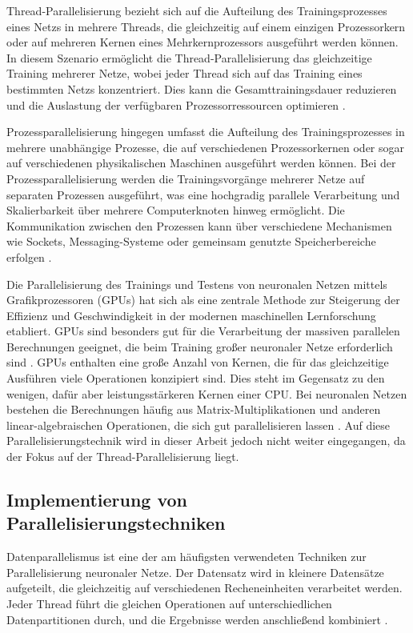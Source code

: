 Thread-Parallelisierung bezieht sich auf die Aufteilung des Trainingsprozesses eines Netzs in mehrere Threads, die gleichzeitig auf einem einzigen Prozessorkern oder auf mehreren Kernen eines Mehrkernprozessors ausgeführt werden können. In diesem Szenario ermöglicht die Thread-Parallelisierung das gleichzeitige Training mehrerer Netze, wobei jeder Thread sich auf das Training eines bestimmten Netzs konzentriert. Dies kann die Gesamttrainingsdauer reduzieren und die Auslastung der verfügbaren Prozessorressourcen optimieren \citep{Flynn_Computer_Organizations_and_their_Effectiveness}.

Prozessparallelisierung hingegen umfasst die Aufteilung des Trainingsprozesses in mehrere unabhängige Prozesse, die auf verschiedenen Prozessorkernen oder sogar auf verschiedenen physikalischen Maschinen ausgeführt werden können. Bei der Prozessparallelisierung werden die Trainingsvorgänge mehrerer Netze auf separaten Prozessen ausgeführt, was eine hochgradig parallele Verarbeitung und Skalierbarkeit über mehrere Computerknoten hinweg ermöglicht. Die Kommunikation zwischen den Prozessen kann über verschiedene Mechanismen wie Sockets, Messaging-Systeme oder gemeinsam genutzte Speicherbereiche erfolgen \citep{Flynn_Computer_Organizations_and_their_Effectiveness}.

Die Parallelisierung des Trainings und Testens von neuronalen Netzen mittels Grafikprozessoren (GPUs) hat sich als eine zentrale Methode zur Steigerung der Effizienz und Geschwindigkeit in der modernen maschinellen Lernforschung etabliert. GPUs sind besonders gut für die Verarbeitung der massiven parallelen Berechnungen geeignet, die beim Training großer neuronaler Netze erforderlich sind \citep{scalable_parallel_programming_with_cuda}. GPUs enthalten eine große Anzahl von Kernen, die für das gleichzeitige Ausführen viele Operationen konzipiert sind. Dies steht im Gegensatz zu den wenigen, dafür aber leistungsstärkeren Kernen einer CPU. Bei neuronalen Netzen bestehen die Berechnungen häufig aus Matrix-Multiplikationen und anderen linear-algebraischen Operationen, die sich gut parallelisieren lassen \citep{scalable_parallel_programming_with_cuda}. Auf diese Parallelisierungstechnik wird in dieser Arbeit jedoch nicht weiter eingegangen, da der Fokus auf der Thread-Parallelisierung liegt.

\subsection{Implementierung von Parallelisierungstechniken}
\label{sec:Grundlagen_Parallelisierung_Implementierung}
Datenparallelismus ist eine der am häufigsten verwendeten Techniken zur Parallelisierung neuronaler Netze. Der Datensatz wird in kleinere Datensätze aufgeteilt, die gleichzeitig auf verschiedenen Recheneinheiten verarbeitet werden. Jeder Thread führt die gleichen Operationen auf unterschiedlichen Datenpartitionen durch, und die Ergebnisse werden anschließend kombiniert \citep{pytorch_advances_in_neural_systems}.

